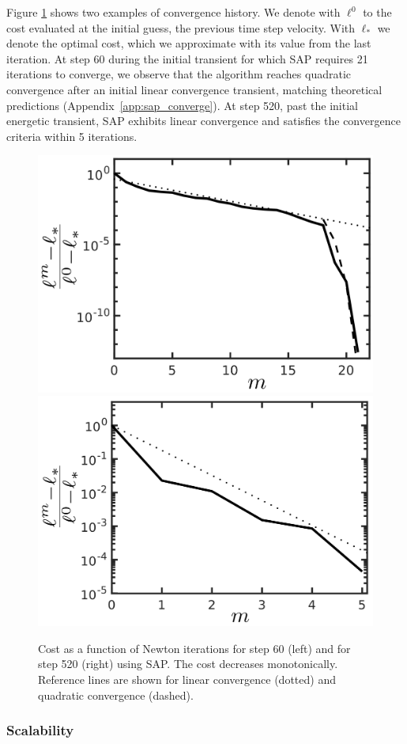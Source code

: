 Figure \ref{fig:clutter_line_search} shows two examples of convergence history. We denote with $\ell^0$ to the cost evaluated at the
initial guess, the previous time step velocity. With $\ell_*$ we denote the
optimal cost, which we approximate with its value from the last iteration. At
step 60 during the initial transient for which SAP requires 21 iterations to
converge, we observe that the algorithm reaches quadratic convergence after an
initial linear convergence transient, matching theoretical predictions (Appendix~\ref{app:sap_converge}). At step 520, past the initial energetic
transient, SAP exhibits linear convergence and satisfies the convergence
criteria within 5 iterations.
\begin{figure}[!h]
	\centering
    \includegraphics[height=0.34\columnwidth]{figures/clutter/normalized_cost_step60_21its_wwalls_latex_labels.png}
	\includegraphics[height=0.34\columnwidth]{figures/clutter/normalized_cost_step520_5its_wwalls_latex_labels.png}    
	\caption{\label{fig:clutter_line_search} 
	Cost as a function of Newton iterations for step 60 (left) and for step 520 (right) using SAP. The cost decreases monotonically. Reference lines are shown for linear convergence (dotted) and quadratic convergence (dashed).}
\end{figure}

\subsubsection{Scalability}

